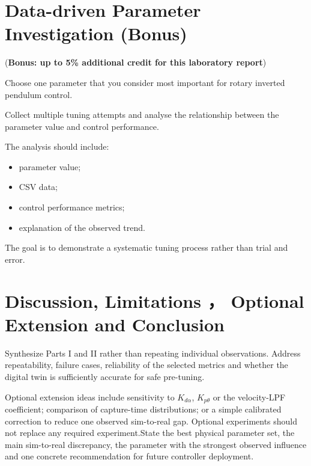 \documentclass[11pt,a4paper]{article}
\newcommand{\studenttext}[1]{\begin{studentbox}\vspace{#1}\end{studentbox}}
\begin{document}
\section{Data-driven Parameter Investigation (Bonus)}
(\textbf{Bonus: up to 5\% additional credit for this laboratory report})


Choose one parameter that you consider most important for rotary inverted
pendulum control.

Collect multiple tuning attempts and analyse the relationship between the
parameter value and control performance.

The analysis should include:

\begin{itemize}
    \item parameter value;
    \item CSV data;
    \item control performance metrics;
    \item explanation of the observed trend.
\end{itemize}

The goal is to demonstrate a systematic tuning process rather than trial and
error.


\section{Discussion, Limitations ， Optional Extension and Conclusion}
Synthesize Parts I and II rather than repeating individual observations. Address repeatability, failure cases, reliability of the selected metrics and whether the digital twin is sufficiently accurate for safe pre-tuning.

Optional extension ideas include sensitivity to $K_{d\alpha}$, $K_{p\theta}$ or the velocity-LPF coefficient; comparison of capture-time distributions; or a simple calibrated correction to reduce one observed sim-to-real gap. Optional experiments should not replace any required experiment.State the best physical parameter set, the main sim-to-real discrepancy, the parameter with the strongest observed influence and one concrete recommendation for future controller deployment.

\studenttext{50mm}
\end{document}

